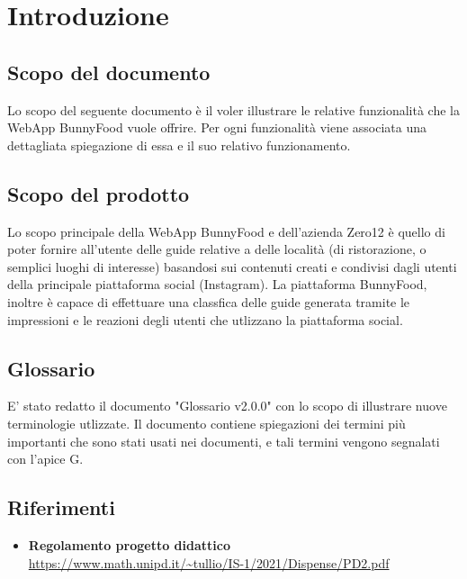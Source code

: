 \section{Introduzione}

\subsection*{Scopo del documento}
Lo scopo del seguente documento è il voler illustrare
le relative funzionalità che la WebApp BunnyFood vuole offrire.
Per ogni funzionalità viene associata una dettagliata spiegazione di essa e
il suo relativo funzionamento.

\subsection*{Scopo del prodotto}
Lo scopo principale della WebApp BunnyFood e dell'azienda Zero12 è quello di poter fornire all'utente delle guide
relative a delle località (di ristorazione, o semplici luoghi di interesse) basandosi sui contenuti creati e condivisi dagli utenti
della principale piattaforma social (Instagram). 
La piattaforma BunnyFood, inoltre è capace di effettuare una classfica delle guide generata tramite le impressioni e le reazioni degli utenti 
che utlizzano la piattaforma social.

\subsection*{Glossario}
E' stato redatto il documento "Glossario v2.0.0" con lo scopo di illustrare nuove terminologie utlizzate.
Il documento contiene spiegazioni dei termini più importanti che sono stati usati nei documenti, e tali termini
vengono segnalati con l'apice G.

\subsection*{Riferimenti}
\begin{itemize}
	\item
	{\textbf{Regolamento progetto didattico}}\\\url{https://www.math.unipd.it/~tullio/IS-1/2021/Dispense/PD2.pdf}

\end{itemize}
